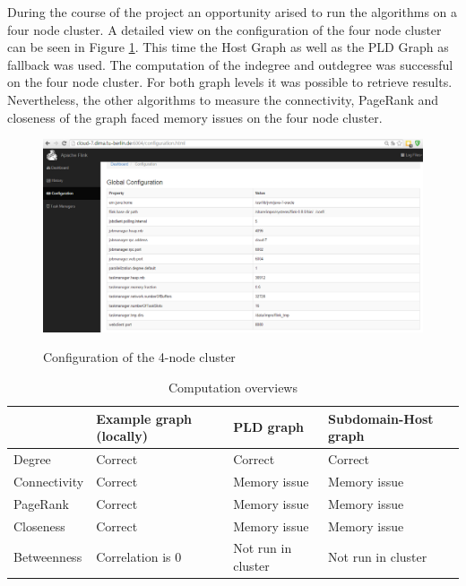 During the course of the project an opportunity arised to run the algorithms on a four node cluster. A detailed view on the configuration of the four node cluster can be seen in Figure \ref{fig6a}. This time the Host Graph as well as the PLD Graph as fallback was used. The computation of the indegree and outdegree was successful on the four node cluster. For both graph levels it was possible to retrieve results. Nevertheless, the other algorithms to measure the connectivity, PageRank and closeness of the graph faced memory issues on the four node cluster.

\begin{figure}[H]
	\begin{center}
		\label{fig6a}		
		\includegraphics[width=1.0\textwidth]{fig6a}	
		\caption{Configuration of the 4-node cluster}	
	\end{center}
\end{figure}

\begin{table}[H]
	\caption{Computation overviews}
	\label{t3}
	\begin{center}
		\begin{tabular}{|l|l|l|l|}
			\hline		
				&Example graph (locally)	&PLD graph	&Subdomain-Host graph \\ \hline
			Degree	&Correct	&Correct	&Correct \\ \hline
			Connectivity	&Correct	&Memory issue	&Memory issue	\\ \hline
			PageRank	&Correct	&Memory issue	&Memory issue	\\ \hline
			Closeness	&Correct	&Memory issue	&Memory issue	\\ \hline
			Betweenness	&Correlation is 0	&Not run in cluster	&Not run in cluster	\\ \hline
		\end{tabular}
	\end{center}
\end{table}

